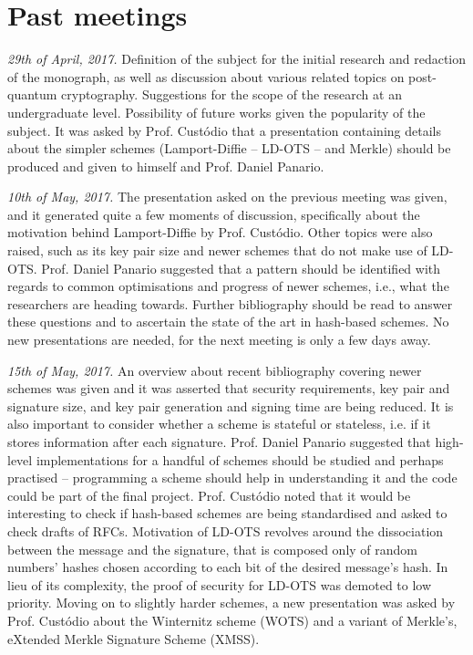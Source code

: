\newcommand{\rfc}{Prof. Custódio}
\newcommand{\dan}{Prof. Daniel Panario}
\newcommand{\hh}{$\mathcal{H}$}
\newcommand{\hash}[2][]{\mathcal{H}^{#1}(#2)}

\section*{Past meetings}

\emph{29th of April, 2017.} Definition of the subject for the initial research
and redaction of the monograph, as well as discussion about various related
topics on post-quantum cryptography. Suggestions for the scope of the research
at an undergraduate level. Possibility of future works given the popularity of
the subject. It was asked by \rfc{} that a presentation containing details
about the simpler schemes (Lamport-Diffie -- LD-OTS -- and Merkle) should be
produced and given to himself and \dan{}.

\emph{10th of May, 2017.} The presentation asked on the previous meeting was
given, and it generated quite a few moments of discussion, specifically about
the motivation behind Lamport-Diffie by \rfc{}. Other topics were also raised,
such as its key pair size and newer schemes that do not make use of LD-OTS.
\dan{} suggested that a pattern should be identified with regards to common
optimisations and progress of newer schemes, i.e., what the researchers are
heading towards. Further bibliography should be read to answer these questions
and to ascertain the state of the art in hash-based schemes. No new
presentations are needed, for the next meeting is only a few days away.

\emph{15th of May, 2017.} An overview about recent bibliography covering newer
schemes was given and it was asserted that security requirements, key pair and
signature size, and key pair generation and signing time are being reduced. It
is also important to consider whether a scheme is stateful or stateless, i.e.
if it stores information after each signature. \dan{} suggested that high-level
implementations for a handful of schemes should be studied and perhaps
practised -- programming a scheme should help in understanding it and the code
could be part of the final project. \rfc{} noted that it would be interesting
to check if hash-based schemes are being standardised and asked to check drafts
of RFCs.  Motivation of LD-OTS revolves around the dissociation between the
message and the signature, that is composed only of random numbers' hashes
chosen according to each bit of the desired message's hash. In lieu of its
complexity, the proof of security for LD-OTS was demoted to low priority.
Moving on to slightly harder schemes, a new presentation was asked by \rfc{}
about the Winternitz scheme (WOTS) and a variant of Merkle's, eXtended Merkle
Signature Scheme (XMSS).

